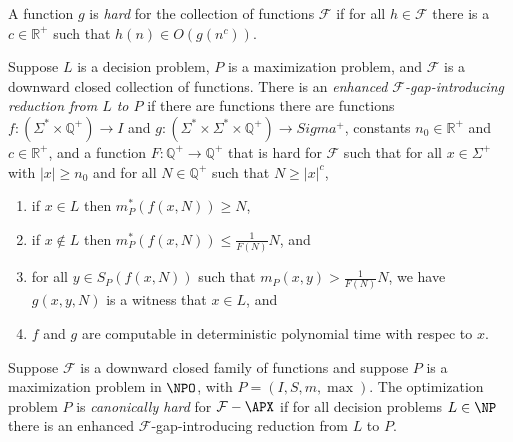 \documentclass{article}
\begin{document}
\begin{definition}\label{def:hardfunction}
  A function $g$ is \emph{hard} for the collection of functions $\mathcal{F}$ if for all $h \in \mathcal{F}$ there is a $c \in \mathbb{R}^+$ such that $h(n) \in O(g(n^c))$.
\end{definition}

\begin{definition}\label{def:gapintroducing}
  Suppose $L$ is a decision problem, $P$ is a maximization problem, and $\mathcal{F}$ is a downward closed collection of functions.
  There is an \emph{enhanced $\mathcal{F}$-gap-introducing reduction from $L$ to $P$} if there are functions there are functions $f \colon \left(\Sigma^* \times \mathbb{Q}^+ \right) \to I$ and $g \colon \left( \Sigma^* \times \Sigma^* \times \mathbb{Q}^+\right) \to Sigma^+$, constants $n_0 \in \mathbb{R}^+$ and $c \in \mathbb{R}^+$, and a function $F \colon \mathbb{Q}^+ \to \mathbb{Q}^+$ that is hard for $\mathcal{F}$ such that for all $x \in \Sigma^+$ with $|x| \geq n_0$ and for all $N \in \mathbb{Q}^+$ such that $N \geq |x|^c$,
  \begin{enumerate}
  \item if $x \in L$ then $m_P^*(f(x, N)) \geq N$,
  \item if $x \notin L$ then $m_P^*(f(x, N)) \leq \frac{1}{F(N)} N$, and
  \item for all $y \in S_P(f(x, N))$ such that $m_P(x, y) > \frac{1}{F(N)} N$, we have $g(x, y, N)$ is a witness that $x \in L$, and
  \item $f$ and $g$ are computable in deterministic polynomial time with respec to $x$.
  \end{enumerate}
\end{definition}

\begin{definition}\label{def:canonicallyhard}
  Suppose $\mathcal{F}$ is a downward closed family of functions and suppose $P$ is a maximization problem in $\NPO$, with $P = (I, S, m, \max)$.
  The optimization problem $P$ is \emph{canonically hard} for $\mathcal{F}-\APX$ if for all decision problems $L \in \NP$ there is an enhanced $\mathcal{F}$-gap-introducing reduction from $L$ to $P$.
\end{definition}
\end{document}
